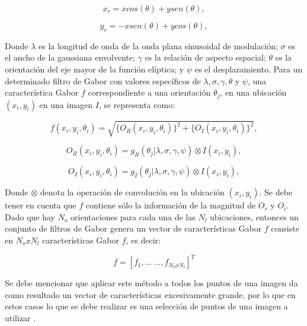 \begin{enumerate}
\begin{equation}
x_{r}=xcos(\theta)+ysen(\theta),
\end{equation}

\begin{equation}
y_{r}=-xsen(\theta)+ycos(\theta),
\end{equation}

Donde $\lambda$ es la longitud de onda de la onda plana sinusoidal de modulación; $\sigma$ es el ancho de la gaussiana envolvente; $\gamma$ es la relación de aspecto espacial; $\theta$ es la orientación del eje mayor de la función elíptica; y $\psi$ es el desplazamiento. Para un determinado filtro de Gabor con valores específicos de $\lambda, \sigma, \gamma, \theta$ y $\psi$, una característica Gabor $f$ correspondiente a una orientación $\theta_{j}$, en una ubicación $(x_{i},y_{i})$ en una imagen $I$, se representa como:

\begin{equation}
f(x_{i},y_{i},\theta_{i})=\sqrt{\{O_{R}(x_{i},y_{i},\theta_{i})\}^{2}+\{O_{I}(x_{i},y_{i},\theta_{i})\}^{2}},
\end{equation}

\begin{equation}
O_{R}(x_{i},y_{i},\theta_{i})=g_{R}(\theta_{j}|\lambda,\sigma,\gamma,\psi)\otimes I(x_{i},y_{i}),
\end{equation}

\begin{equation}
O_{I}(x_{i},y_{i},\theta_{i})=g_{I}(\theta_{j}|\lambda,\sigma,\gamma,\psi)\otimes I(x_{i},y_{i}),
\end{equation}

Donde $\otimes$ denota la operación de convolución en la ubicación $(x_{i},y_{i})$. Se debe tener en cuenta que $f$ contiene sólo la información de la magnitud de $O_{r}$ y $O_{i}$. Dado que hay $N_{o}$ orientaciones para cada una de las $N_{l}$ ubicaciones, entonces un conjunto de filtros de Gabor genera un vector de características Gabor $f$ consiste en $N_{o}xN_{l}$ características Gabor $f$, es decir: 

\begin{equation}
f=[f_{1},...\ ...,f_{N_{0}xN_{l}}]^{T}
\end{equation}

Se debe mencionar que aplicar este método a todos los puntos de una imagen da como resultado un vector de características excesivamente grande, por lo que en estos casos lo que se debe realizar es una selección de puntos de una imagen a utilizar \citep{Adams}.


\end{enumerate}
